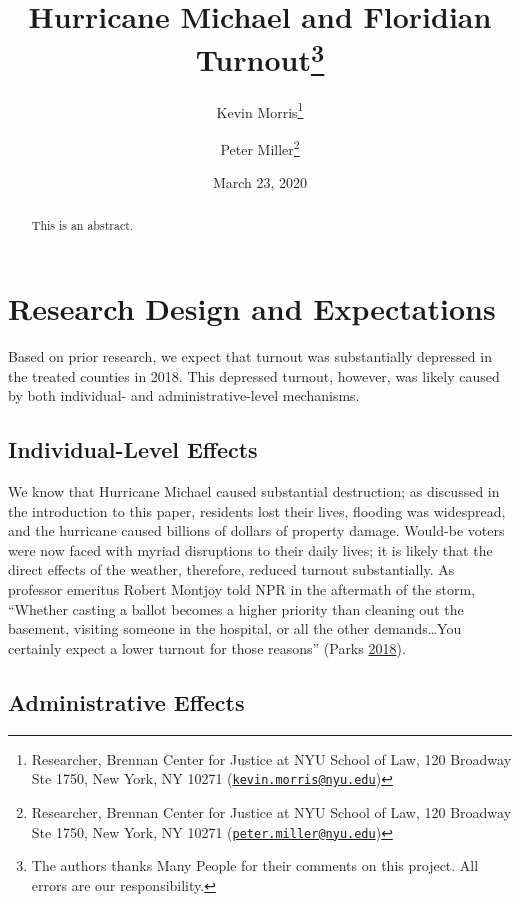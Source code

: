 \documentclass[
  12pt,
]{article}
\title{Hurricane Michael and Floridian Turnout\thanks{The authors thanks Many People for their comments on this project. All errors are our responsibility.}}
\author{Kevin Morris\footnote{Researcher, Brennan Center for Justice at NYU School of Law, 120 Broadway Ste 1750, New York, NY 10271 (\href{mailto:kevin.morris@nyu.edu}{\nolinkurl{kevin.morris@nyu.edu}})} \and Peter Miller\footnote{Researcher, Brennan Center for Justice at NYU School of Law, 120 Broadway Ste 1750, New York, NY 10271 (\href{mailto:peter.miller@nyu.edu}{\nolinkurl{peter.miller@nyu.edu}})}}
\date{March 23, 2020}
\begin{document}
\maketitle
\begin{abstract}
This is an abstract.
\end{abstract}

\pagebreak

\doublespacing

\hypertarget{research-design-and-expectations}{%
\section*{Research Design and Expectations}\label{research-design-and-expectations}}

Based on prior research, we expect that turnout was substantially depressed in the treated counties in 2018. This depressed turnout, however, was likely caused by both individual- and administrative-level mechanisms.

\hypertarget{individual-level-effects}{%
\subsection*{Individual-Level Effects}\label{individual-level-effects}}

We know that Hurricane Michael caused substantial destruction; as discussed in the introduction to this paper, residents lost their lives, flooding was widespread, and the hurricane caused billions of dollars of property damage. Would-be voters were now faced with myriad disruptions to their daily lives; it is likely that the direct effects of the weather, therefore, reduced turnout substantially. As professor emeritus Robert Montjoy told NPR in the aftermath of the storm, ``Whether casting a ballot becomes a higher priority than cleaning out the basement, visiting someone in the hospital, or all the other demands\ldots You certainly expect a lower turnout for those reasons'' (Parks \protect\hyperlink{ref-Parks2018}{2018}).

\hypertarget{administrative-effects}{%
\subsection*{Administrative Effects}\label{administrative-effects}}
\end{document}
